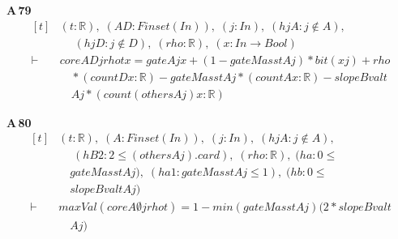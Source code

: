 \noindent\textbf{A\,79}\quad{}
{\footnotesize\[ \begin{aligned}[t]
&(\mathit{t} : \mathbb{R} ),\; (\mathit{A} \mathit{D} : \mathit{Finset} (\mathit{I} \mathit{n})),\; (\mathit{j} : \mathit{I} \mathit{n}),\; (\mathit{hjA} : \mathit{j} \notin \mathit{A}),\\
&\quad \; (\mathit{hjD} : \mathit{j} \notin \mathit{D}),\; (\mathit{rho} : \mathbb{R} ),\; (\mathit{x} : \mathit{I} \mathit{n} \to \mathit{Bool})\\
\vdash\;&\mathit{core} \mathit{A} \mathit{D} \mathit{j} \mathit{rho} \mathit{t} \mathit{x} = \mathit{gate} \mathit{A} \mathit{j} \mathit{x}+(1-\mathit{gateMass} \mathit{t} \mathit{A} \mathit{j})*\mathit{bit} (\mathit{x} \mathit{j}) +\mathit{rho}\\
&\quad *(\mathit{count} \mathit{D} \mathit{x} : \mathbb{R} )-\mathit{gateMass} \mathit{t} \mathit{A} \mathit{j}*(\mathit{count} \mathit{A} \mathit{x} : \mathbb{R} ) -\mathit{slopeBval} \mathit{t}\\
&\quad \mathit{A} \mathit{j}*(\mathit{count} (\mathit{others} \mathit{A} \mathit{j}) \mathit{x} : \mathbb{R} )
\end{aligned} \]}

\noindent\textbf{A\,80}\quad{}
{\footnotesize\[ \begin{aligned}[t]
&(\mathit{t} : \mathbb{R} ),\; (\mathit{A} : \mathit{Finset} (\mathit{I} \mathit{n})),\; (\mathit{j} : \mathit{I} \mathit{n}),\; (\mathit{hjA} : \mathit{j} \notin \mathit{A}),\\
&\quad \; (\mathit{hB2} : 2 \leq (\mathit{others} \mathit{A} \mathit{j}).\mathit{card}),\; (\mathit{rho} : \mathbb{R} ),\; (\mathit{ha} : 0 \leq\\
&\quad \mathit{gateMass} \mathit{t} \mathit{A} \mathit{j}),\; (\mathit{ha1} : \mathit{gateMass} \mathit{t} \mathit{A} \mathit{j} \leq 1),\; (\mathit{hb} : 0 \leq\\
&\quad \mathit{slopeBval} \mathit{t} \mathit{A} \mathit{j})\\
\vdash\;&\mathit{maxVal} (\mathit{core} \mathit{A} \emptyset \mathit{j} \mathit{rho} \mathit{t}) = 1-\mathit{min} (\mathit{gateMass} \mathit{t} \mathit{A} \mathit{j}) (2*\mathit{slopeBval} \mathit{t}\\
&\quad \mathit{A} \mathit{j})
\end{aligned} \]}

